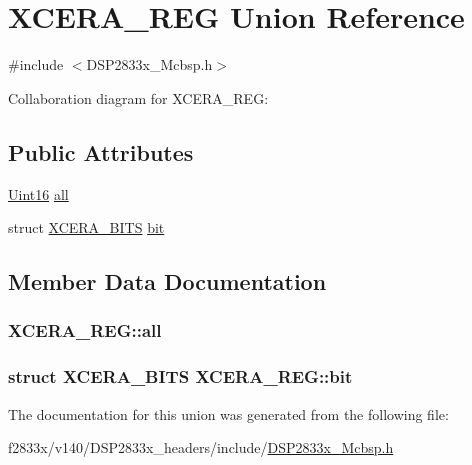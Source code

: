 \hypertarget{union_x_c_e_r_a___r_e_g}{}\section{X\+C\+E\+R\+A\+\_\+\+R\+E\+G Union Reference}
\label{union_x_c_e_r_a___r_e_g}


{\ttfamily \#include $<$D\+S\+P2833x\+\_\+\+Mcbsp.\+h$>$}



Collaboration diagram for X\+C\+E\+R\+A\+\_\+\+R\+E\+G\+:
\subsection*{Public Attributes}
\begin{DoxyCompactItemize}
\item 
\hyperlink{_d_s_p2833x___device_8h_a59a9f6be4562c327cbfb4f7e8e18f08b}{Uint16} \hyperlink{union_x_c_e_r_a___r_e_g_a224bdb8acf23837f8790ebbc54cc9a7a}{all}
\item 
struct \hyperlink{struct_x_c_e_r_a___b_i_t_s}{X\+C\+E\+R\+A\+\_\+\+B\+I\+T\+S} \hyperlink{union_x_c_e_r_a___r_e_g_a6451c4bd8feaf803b31899881c7f4215}{bit}
\end{DoxyCompactItemize}


\subsection{Member Data Documentation}
\hypertarget{union_x_c_e_r_a___r_e_g_a224bdb8acf23837f8790ebbc54cc9a7a}{}
\subsubsection[{all}]{ X\+C\+E\+R\+A\+\_\+\+R\+E\+G\+::all}\label{union_x_c_e_r_a___r_e_g_a224bdb8acf23837f8790ebbc54cc9a7a}
\hypertarget{union_x_c_e_r_a___r_e_g_a6451c4bd8feaf803b31899881c7f4215}{}
\subsubsection[{bit}]{\setlength{\rightskip}{0pt plus 5cm}struct {\bf X\+C\+E\+R\+A\+\_\+\+B\+I\+T\+S} X\+C\+E\+R\+A\+\_\+\+R\+E\+G\+::bit}\label{union_x_c_e_r_a___r_e_g_a6451c4bd8feaf803b31899881c7f4215}


The documentation for this union was generated from the following file\+:\begin{DoxyCompactItemize}
\item 
f2833x/v140/\+D\+S\+P2833x\+\_\+headers/include/\hyperlink{_d_s_p2833x___mcbsp_8h}{D\+S\+P2833x\+\_\+\+Mcbsp.\+h}\end{DoxyCompactItemize}
